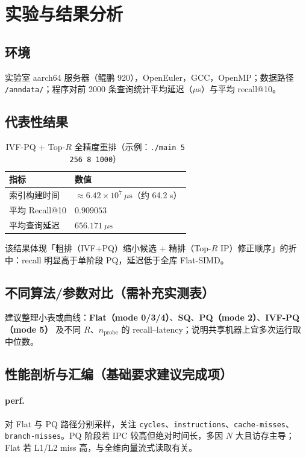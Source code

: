 \documentclass[UTF8,a4paper,11pt]{ctexart}
\begin{document}
\section{实验与结果分析}
\label{sec:exp}

\subsection{环境}

实验室 aarch64 服务器（鲲鹏 920），OpenEuler，GCC，OpenMP；数据路径 \texttt{/anndata/}；程序对前 2000 条查询统计平均延迟（$\mu$s）与平均 recall@10。

\subsection{代表性结果}

\begin{table}[htbp]
  \centering
  \caption{IVF-PQ + Top-$R$ 全精度重排（示例：\texttt{./main 5 256 8 1000}）}
  \begin{tabular}{@{}ll@{}}
    \toprule
    指标 & 数值 \\
    \midrule
    索引构建时间 & $\approx 6.42\times 10^{7}\ \mu\mathrm{s}$（约 64.2 s） \\
    平均 Recall@10 & $0.909053$ \\
    平均查询延迟 & $656.171\ \mu\mathrm{s}$ \\
    \bottomrule
  \end{tabular}
\end{table}

该结果体现「粗排（IVF+PQ）缩小候选 + 精排（Top-$R$ IP）修正顺序」的折中：recall 明显高于单阶段 PQ，延迟低于全库 Flat-SIMD。

\subsection{不同算法/参数对比（需补充实测表）}

建议整理小表或曲线：\textbf{Flat（mode 0/3/4）}、\textbf{SQ}、\textbf{PQ（mode 2）}、\textbf{IVF-PQ（mode 5）} 及不同 $R$、$n_{\mathrm{probe}}$ 的 recall--latency；说明共享机器上宜多次运行取中位数。

\subsection{性能剖析与汇编（基础要求建议完成项）}

\paragraph{perf.}
对 Flat 与 PQ 路径分别采样，关注 \texttt{cycles}、\texttt{instructions}、\texttt{cache-misses}、\texttt{branch-misses}。PQ 阶段若 IPC 较高但绝对时间长，多因 $N$ 大且访存主导；Flat 若 L1/L2 miss 高，与全维向量流式读取有关。
\end{document}
